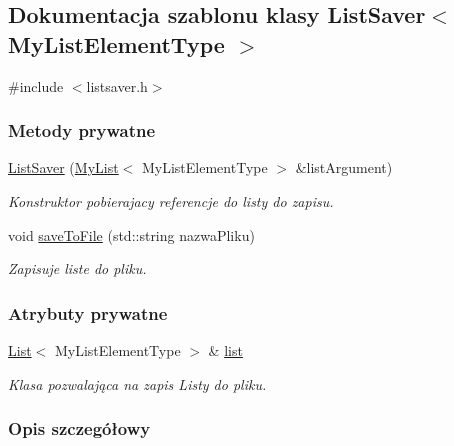 \hypertarget{class_list_saver}{\subsection{Dokumentacja szablonu klasy List\-Saver$<$ My\-List\-Element\-Type $>$}
\label{class_list_saver}
}


{\ttfamily \#include $<$listsaver.\-h$>$}

\subsubsection*{Metody prywatne}
\begin{DoxyCompactItemize}
\item 
\hyperlink{class_list_saver_a21653fc0fc232e603b8fc47e165e771e}{List\-Saver} (\hyperlink{class_my_list}{My\-List}$<$ My\-List\-Element\-Type $>$ \&list\-Argument)
\begin{DoxyCompactList}\small\item\em Konstruktor pobierajacy referencje do listy do zapisu. \end{DoxyCompactList}\item 
void \hyperlink{class_list_saver_aca01f3dc903c68db05b23edcb7b11918}{save\-To\-File} (std\-::string nazwa\-Pliku)
\begin{DoxyCompactList}\small\item\em Zapisuje liste do pliku. \end{DoxyCompactList}\end{DoxyCompactItemize}
\subsubsection*{Atrybuty prywatne}
\begin{DoxyCompactItemize}
\item 
\hyperlink{class_list}{List}$<$ My\-List\-Element\-Type $>$ \& \hyperlink{class_list_saver_ac803162ee7ee2580226d530f89683ecb}{list}
\begin{DoxyCompactList}\small\item\em Klasa pozwalająca na zapis Listy do pliku. \end{DoxyCompactList}\end{DoxyCompactItemize}


\subsubsection{Opis szczegółowy}
